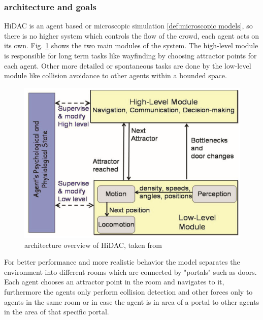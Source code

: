 \documentclass{acmsiggraph}               %
\begin{document}
\subsubsection{architecture and goals}
HiDAC is an agent based or microscopic simulation \ref{def:microscopic models}, so there is no higher system which controls the flow of the crowd, each agent acts on its own.
Fig. \ref{fig:hidacArchitecture} shows the two main modules of the system. The high-level module is responsible for long term tasks like wayfinding by choosing attractor points for each agent. Other more detailed or spontaneous tasks are done by the low-level module like collision avoidance to other agents  within a bounded space.
\begin{figure}[h]
  \centering
  \includegraphics[width=1\linewidth]{images/hidac-architacture.png}
  \caption{architecture overview of HiDAC,  taken from \protect\cite{pelechano_controlling_2007}}
  \label{fig:hidacArchitecture}
\end{figure}
For better performance and more realistic behavior the model separates the environment into different rooms which are connected by "portals" such as doors. Each agent chooses an attractor point in the room and navigates to it, furthermore the agents only perform collision detection and other forces only to agents in the same room or in case the agent is in area of a portal to other agents in the area of that specific portal.
\end{document}
